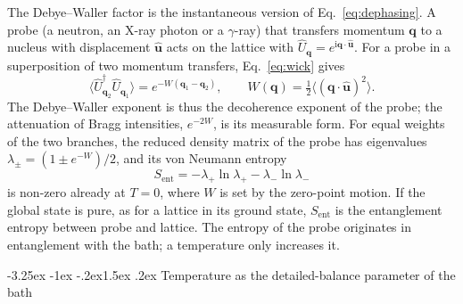 \documentclass[10pt,a4paper]{article}
\makeatletter
\renewcommand{\subsection}{\@startsection{subsection}{2}{\z@}%
  {-3.25ex \@plus -1ex \@minus -.2ex}{1.5ex \@plus .2ex}%
  {\normalfont\fontsize{15.5pt}{19pt}\selectfont\bfseries}}
\newcommand{\ii}{\mathrm{i}}
\makeatother
\begin{document}
The Debye--Waller factor is the instantaneous version of Eq.~\eqref{eq:dephasing}.
A probe (a neutron, an X-ray photon or a $ \gamma $-ray) that transfers momentum $ \mathbf q $ to a nucleus with displacement $ \hat{\mathbf u} $ acts on the lattice with $ \hat U_{\mathbf q} = e^{\ii \mathbf q \cdot \hat{\mathbf u}} $.
For a probe in a superposition of two momentum transfers, Eq.~\eqref{eq:wick} gives
\begin{equation}
  \langle \hat U_{\mathbf q_2}^\dagger \hat U_{\mathbf q_1} \rangle = e^{-W(\mathbf q_1 - \mathbf q_2)} ,
  \qquad
  W(\mathbf q) = \tfrac12 \big\langle (\mathbf q \cdot \hat{\mathbf u})^2 \big\rangle .
  \label{eq:debye-waller}
\end{equation}
The Debye--Waller exponent is thus the decoherence exponent of the probe; the attenuation of Bragg intensities, $ e^{-2W} $, is its measurable form.
For equal weights of the two branches, the reduced density matrix of the probe has eigenvalues $ \lambda_\pm = (1 \pm e^{-W})/2 $, and its von Neumann entropy
\begin{equation}
  S_{\mathrm{ent}} = -\lambda_+ \ln\lambda_+ - \lambda_- \ln\lambda_-
  \label{eq:S-ent}
\end{equation}
is non-zero already at $ T = 0 $, where $ W $ is set by the zero-point motion.
If the global state is pure, as for a lattice in its ground state, $ S_{\mathrm{ent}} $ is the entanglement entropy between probe and lattice.
The entropy of the probe originates in entanglement with the bath; a temperature only increases it.

\subsection{Temperature as the detailed-balance parameter of the bath}
\label{sec:kms}
\end{document}
